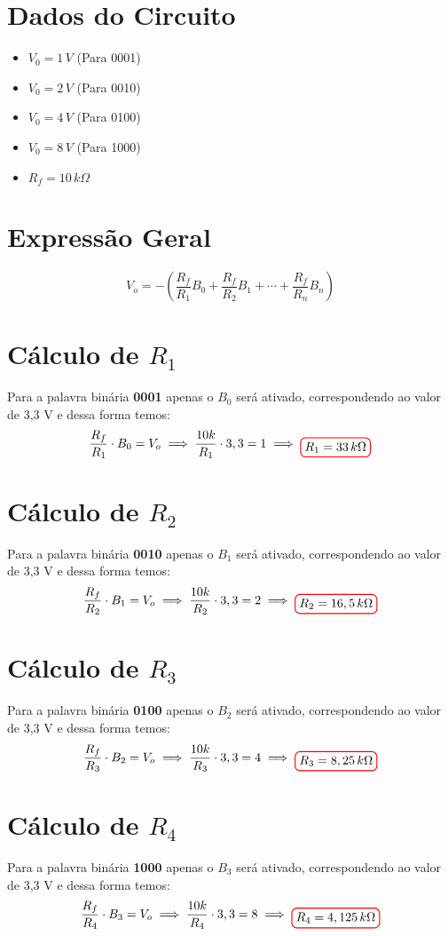 \documentclass[12pt,openany,oneside,a4paper]{abntex2}
\begin{document}
\section{Dados do Circuito}
\begin{itemize}
    \item $V_{0} = 1\,V$ (Para 0001)
    \item $V_{0} = 2\,V$ (Para 0010)
    \item $V_{0} = 4\,V$ (Para 0100)
    \item $V_{0} = 8\,V$ (Para 1000)
    \item $R_{f} = 10\,{k}\Omega$
\end{itemize}

\section{Expressão Geral}
\[
V_{o} = - \left( \frac{R_{f}}{R_{1}} B_{0} + \frac{R_{f}}{R_{2}} B_{1} + \cdots + \frac{R_{f}}{R_{n}} B_{n} \right)
\]

\section{Cálculo de $R_1$}
Para a palavra binária \textbf{0001} apenas o $B_{0}$ será ativado, correspondendo ao valor de 3{,}3 V e dessa forma temos: 
\\
\[
\frac{R_{f}}{R_{1}} \cdot B_{0} = V_{o} \implies \frac{10k}{R_{1}} \cdot 3,3 = 1 \implies \tikz[baseline]{\node[draw=red, thick, rounded corners] {$R_{1} = 33 \text\,{k}\Omega$};}
\]

\section{Cálculo de $R_2$}
Para a palavra binária \textbf{0010} apenas o $B_{1}$ será ativado, correspondendo ao valor de 3{,}3 V e dessa forma temos: 
\\
\[
\frac{R_{f}}{R_{2}} \cdot B_{1} = V_{o} \implies \frac{10k}{R_{2}} \cdot 3,3 = 2 \implies \tikz[baseline]{\node[draw=red, thick, rounded corners] {$R_{2} = 16,5 \text\,{k}\Omega$};}
\]

\section{Cálculo de $R_3$}
Para a palavra binária \textbf{0100} apenas o $B_{2}$ será ativado, correspondendo ao valor de 3{,}3 V e dessa forma temos: 
\\
\[
\frac{R_{f}}{R_{3}} \cdot B_{2} = V_{o} \implies \frac{10k}{R_{3}} \cdot 3,3 = 4 \implies \tikz[baseline]{\node[draw=red, thick, rounded corners] {$R_{3} = 8,25 \text\,{k}\Omega$};}
\]

\section{Cálculo de $R_4$}
Para a palavra binária \textbf{1000} apenas o $B_{3}$ será ativado, correspondendo ao valor de 3{,}3 V e dessa forma temos: 
\\
\[
\frac{R_{f}}{R_{4}} \cdot B_{3} = V_{o} \implies \frac{10k}{R_{4}} \cdot 3,3 = 8 \implies \tikz[baseline]{\node[draw=red, thick, rounded corners] {$R_{4} = 4,125 \text\,{k}\Omega$};}
\]
\end{document}
